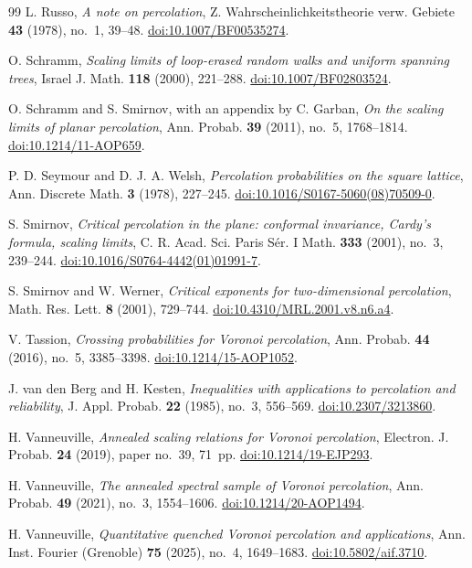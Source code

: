 \begin{thebibliography}{99}
L. Russo,
\emph{A note on percolation},
Z. Wahrscheinlichkeitstheorie verw. Gebiete \textbf{43} (1978), no.~1,
39--48.
\href{https://doi.org/10.1007/BF00535274}{doi:10.1007/BF00535274}.

O. Schramm,
\emph{Scaling limits of loop-erased random walks and uniform spanning
trees},
Israel J. Math. \textbf{118} (2000), 221--288.
\href{https://doi.org/10.1007/BF02803524}{doi:10.1007/BF02803524}.

O. Schramm and S. Smirnov, with an appendix by C. Garban,
\emph{On the scaling limits of planar percolation},
Ann. Probab. \textbf{39} (2011), no.~5, 1768--1814.
\href{https://doi.org/10.1214/11-AOP659}{doi:10.1214/11-AOP659}.

P. D. Seymour and D. J. A. Welsh,
\emph{Percolation probabilities on the square lattice},
Ann. Discrete Math. \textbf{3} (1978), 227--245.
\href{https://doi.org/10.1016/S0167-5060(08)70509-0}{doi:10.1016/S0167-5060(08)70509-0}.

S. Smirnov,
\emph{Critical percolation in the plane: conformal invariance, Cardy's
formula, scaling limits},
C. R. Acad. Sci. Paris S\'er. I Math. \textbf{333} (2001), no.~3,
239--244.
\href{https://doi.org/10.1016/S0764-4442(01)01991-7}{doi:10.1016/S0764-4442(01)01991-7}.

S. Smirnov and W. Werner,
\emph{Critical exponents for two-dimensional percolation},
Math. Res. Lett. \textbf{8} (2001), 729--744.
\href{https://doi.org/10.4310/MRL.2001.v8.n6.a4}{doi:10.4310/MRL.2001.v8.n6.a4}.

V. Tassion,
\emph{Crossing probabilities for Voronoi percolation},
Ann. Probab. \textbf{44} (2016), no.~5, 3385--3398.
\href{https://doi.org/10.1214/15-AOP1052}{doi:10.1214/15-AOP1052}.

J. van den Berg and H. Kesten,
\emph{Inequalities with applications to percolation and reliability},
J. Appl. Probab. \textbf{22} (1985), no.~3, 556--569.
\href{https://doi.org/10.2307/3213860}{doi:10.2307/3213860}.

H. Vanneuville,
\emph{Annealed scaling relations for Voronoi percolation},
Electron. J. Probab. \textbf{24} (2019), paper no.~39, 71~pp.
\href{https://doi.org/10.1214/19-EJP293}{doi:10.1214/19-EJP293}.

H. Vanneuville,
\emph{The annealed spectral sample of Voronoi percolation},
Ann. Probab. \textbf{49} (2021), no.~3, 1554--1606.
\href{https://doi.org/10.1214/20-AOP1494}{doi:10.1214/20-AOP1494}.

H. Vanneuville,
\emph{Quantitative quenched Voronoi percolation and applications},
Ann. Inst. Fourier (Grenoble) \textbf{75} (2025), no.~4, 1649--1683.
\href{https://doi.org/10.5802/aif.3710}{doi:10.5802/aif.3710}.

\end{thebibliography}

